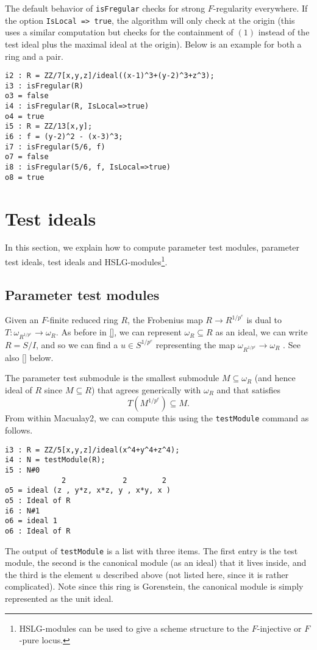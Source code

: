 \documentclass[11pt]{amsart}
\begin{document}
The default behavior of {\tt isFregular} checks for strong $F$-regularity everywhere. If the option {\tt IsLocal => true}, the algorithm will only check at the origin (this uses a similar computation but checks for the containment of $(1)$ instead of the test ideal plus the maximal ideal at the origin). Below is an example for both a ring and a pair.

\begin{verbatim}
i2 : R = ZZ/7[x,y,z]/ideal((x-1)^3+(y-2)^3+z^3);
i3 : isFregular(R)
o3 = false
i4 : isFregular(R, IsLocal=>true)
o4 = true
i5 : R = ZZ/13[x,y];
i6 : f = (y-2)^2 - (x-3)^3;
i7 : isFregular(5/6, f)
o7 = false
i8 : isFregular(5/6, f, IsLocal=>true)
o8 = true
\end{verbatim}


\section{Test ideals}

In this section, we explain how to compute parameter test modules, parameter test ideals, test ideals and HSLG-modules\footnote{HSLG-modules can be used to give a scheme structure to the $F$-injective or $F$-pure locus.}.

\subsection{Parameter test modules}

Given an $F$-finite reduced ring $R$, the Frobenius map $R \to R^{1/p^e}$ is dual to $T : \omega_{R^{1/p^e}} \to \omega_R$.  As before in \autoref{}, we can represent $\omega_R \subseteq R$ as an ideal, we can write $R = S/I$, and so we can find a $u \in S^{1/p^e}$ representing the map $\omega_{R^{1/p^e}} \to \omega_R$ \cite{}.  See also \autoref{} below.

The parameter test submodule is the smallest submodule $M \subseteq \omega_R$ (and hence ideal of $R$ since $M \subseteq R$) that agrees generically with $\omega_R$ and that satisfies
\[
T (M^{1/p^e}) \subseteq M.
\]
From within Macualay2, we can compute this using the {\tt testModule} command as follows.
\begin{verbatim}
i3 : R = ZZ/5[x,y,z]/ideal(x^4+y^4+z^4);
i4 : N = testModule(R);
i5 : N#0
             2             2        2
o5 = ideal (z , y*z, x*z, y , x*y, x )
o5 : Ideal of R
i6 : N#1
o6 = ideal 1
o6 : Ideal of R
\end{verbatim}
The output of {\tt testModule} is a list with three items.  The first entry is the test module, the second is the canonical module (as an ideal) that it lives inside, and the third is the element $u$ described above (not listed here, since it is rather complicated).  Note since this ring is Gorenstein, the canonical module is simply represented as the unit ideal.
\end{document}
